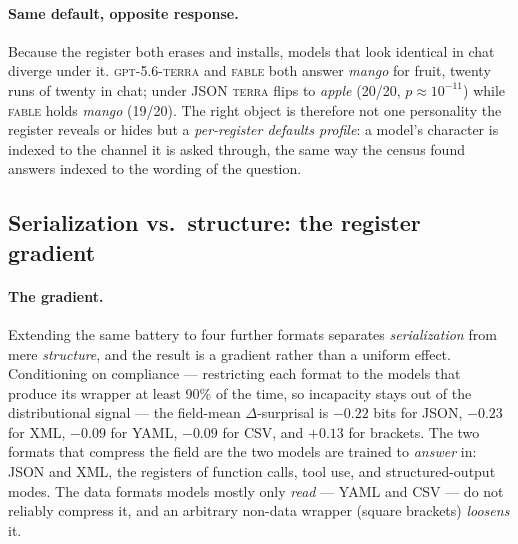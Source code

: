 \documentclass[11pt]{article}
\begin{document}
\paragraph{Same default, opposite response.} Because the register both erases and installs,
models that look identical in chat diverge under it. \textsc{gpt-5.6-terra} and \textsc{fable}
both answer \emph{mango} for fruit, twenty runs of twenty in chat; under JSON \textsc{terra} flips
to \emph{apple} (20/20, $p\approx10^{-11}$) while \textsc{fable} holds \emph{mango} (19/20). The
right object is therefore not one personality the register reveals or hides but a
\emph{per-register defaults profile}: a model's character is indexed to the channel it is asked
through, the same way the census found answers indexed to the wording of the question.

\subsection{Serialization vs.\ structure: the register gradient}
\label{sec:gradient}

\paragraph{The gradient.}
Extending the same battery to four further formats separates \emph{serialization} from mere
\emph{structure}, and the result is a gradient rather than a uniform effect. Conditioning on
compliance --- restricting each format to the models that produce its wrapper at least 90\% of
the time, so incapacity stays out of the distributional signal --- the field-mean
$\Delta$-surprisal is $-0.22$ bits for JSON, $-0.23$ for XML, $-0.09$ for YAML, $-0.09$ for CSV,
and $+0.13$ for brackets. The two formats that compress the field are the two models are trained
to \emph{answer} in: JSON and XML, the registers of function calls, tool use, and
structured-output modes. The data formats models mostly only \emph{read} --- YAML and CSV --- do
not reliably compress it, and an arbitrary non-data wrapper (square brackets) \emph{loosens} it.
\end{document}
